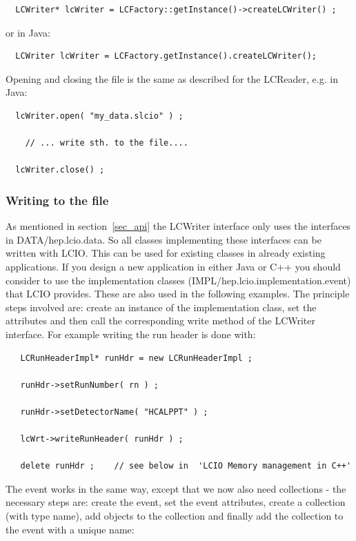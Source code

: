 \documentclass[twoside]{article}
\begin{document}
\begin{verbatim}
  LCWriter* lcWriter = LCFactory::getInstance()->createLCWriter() ;
\end{verbatim}
or in Java:
\begin{verbatim}
  LCWriter lcWriter = LCFactory.getInstance().createLCWriter();
\end{verbatim}


Opening and closing the file is the same as described for the LCReader, e.g. in Java:
\begin{verbatim}
  lcWriter.open( "my_data.slcio" ) ;

    // ... write sth. to the file....

  lcWriter.close() ;
\end{verbatim}

\subsubsection{Writing to the file}
As mentioned in section~\ref{sec_api} the LCWriter interface only uses the interfaces 
in DATA/hep.lcio.data. So all classes implementing these interfaces can be written with LCIO.
This can be used for existing classes in already existing applications. 
If  you design a new application in either Java or C++ you should consider to use the implementation
classes (IMPL/hep.lcio.implementation.event) that LCIO provides.
These are also used in the following examples. The principle steps involved are: 
create an instance of the implementation class, set the attributes and then call the corresponding
write method of the LCWriter interface.
For example writing the run header is done with:

\begin{verbatim}
   LCRunHeaderImpl* runHdr = new LCRunHeaderImpl ; 

   runHdr->setRunNumber( rn ) ;
   
   runHdr->setDetectorName( "HCALPPT" ) ;
   
   lcWrt->writeRunHeader( runHdr ) ;

   delete runHdr ;    // see below in  'LCIO Memory management in C++'
\end{verbatim}

The event works in the same way, except that we now also need collections - the necessary steps are:
create the event, set the event attributes, create a collection (with type name), add objects to the 
collection and finally add the collection to the event with a unique name:
\end{document}
